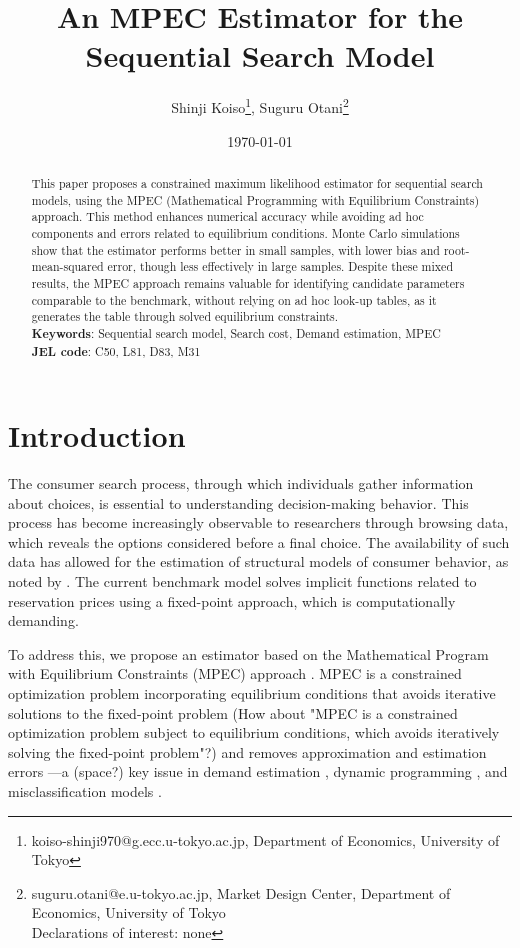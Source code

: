 \documentclass[12pt]{article}
\title{An MPEC Estimator for the Sequential Search Model}
\author{Shinji Koiso\thanks{koiso-shinji970@g.ecc.u-tokyo.ac.jp, Department of Economics, University of Tokyo}, Suguru Otani\thanks{suguru.otani@e.u-tokyo.ac.jp, Market Design Center, Department of Economics, University of Tokyo\\Declarations of interest: none}}
\date{%
\today}
\begin{document}
\maketitle

\begin{abstract}
\noindent
This paper proposes a constrained maximum likelihood estimator for sequential search models, using the MPEC (Mathematical Programming with Equilibrium Constraints) approach. This method enhances numerical accuracy while avoiding ad hoc components and errors related to equilibrium conditions. Monte Carlo simulations show that the estimator performs better in small samples, with lower bias and root-mean-squared error, though less effectively in large samples. Despite these mixed results, the MPEC approach remains valuable for identifying candidate parameters comparable to the benchmark, without relying on ad hoc look-up tables, as it generates the table through solved equilibrium constraints.
\\
\textbf{Keywords}: Sequential search model, Search cost, Demand estimation, MPEC \\
\textbf{JEL code}: C50, L81, D83, M31
\end{abstract}

\section{Introduction}

The consumer search process, through which individuals gather information about choices, is essential to understanding decision-making behavior. This process has become increasingly observable to researchers through browsing data, which reveals the options considered before a final choice. The availability of such data has allowed for the estimation of structural models of consumer behavior, as noted by \cite{ursu2023sequential}. The current benchmark model solves implicit functions related to reservation prices using a fixed-point approach, which is computationally demanding.

To address this, we propose an estimator based on the Mathematical Program with Equilibrium Constraints (MPEC) approach \citep{su2012constrained}. {\color{blue}MPEC is a constrained optimization problem incorporating equilibrium conditions that avoids iterative solutions to the fixed-point problem (How about "MPEC is a constrained optimization problem subject to equilibrium conditions, which avoids iteratively solving the fixed-point problem"?)} and removes approximation and estimation errors {\color{blue}—a (space?)} key issue in demand estimation \citep{dube2012improving}, dynamic programming \citep{su2012constrained}, and misclassification models \citep{lu2014mpec}. 
\end{document}
